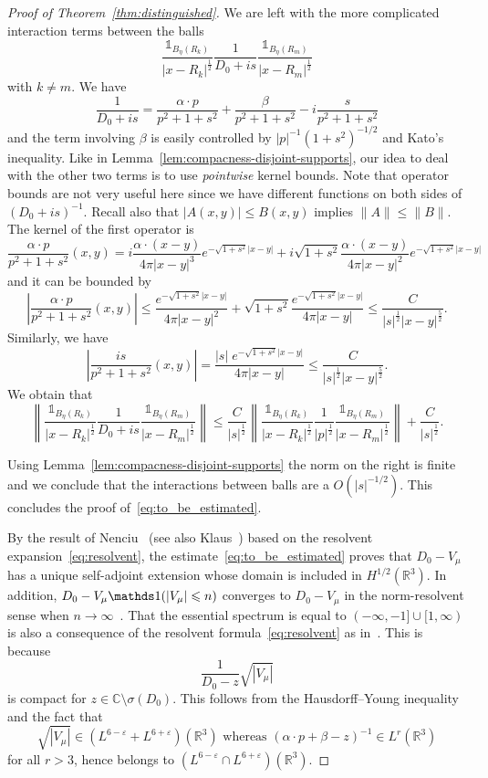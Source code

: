 \documentclass[AHL,Unicode,published]{cedram}
\newcommand{\R}{\mathbb{R}}
\newcommand{\C}{\mathbb{C}}
\newcommand\1{{\ensuremath {\mathds 1} }}
\newcommand{\ii}{\infty}
\newcommand{\norm}[1]{ \left\| #1 \right\|}
\renewcommand{\leq}{\leqslant}
\newcommand{\eps}{\varepsilon}
\begin{document}
\begin{proof}[Proof of Theorem~\ref{thm:distinguished}]
We are left with the more complicated interaction terms between the balls
\begin{equation}\label{eq:interaction_two_balls}
\frac{\1_{B_\eta(R_k)}}{\left|x-R_k\right|^{\frac12}}\frac{1}{D_0+is}\frac{\1_{B_\eta(R_m)}}{\left|x-R_m\right|^{\frac12}}
\end{equation}
with $k\neq m$. We have
\[
\frac{1}{D_0+is}=\frac{\alpha\cdot p}{p^2+1+s^2}+\frac{\beta}{p^2+1+s^2}-i\frac{s}{p^2+1+s^2}
\]
and the term involving $\beta$ is easily controlled by $|p|^{-1}(1+s^2)^{-1/2}$ and Kato's inequality. Like in Lemma~\ref{lem:compacness-disjoint-supports}, our idea to deal with the other two terms is to use \emph{pointwise} kernel bounds. Note that operator bounds are not very useful here since we have different functions on both sides of $(D_0+is)^{-1}$. Recall also that $|A(x,y)|\leq B(x,y)$ implies $\|A\|\leq\|B\|$. The kernel of the first operator is
\[
\frac{\alpha\cdot p}{p^2+1+s^2}(x,y)=i\frac{\alpha\cdot(x-y)}{4\pi|x-y|^3}e^{-\sqrt{1+s^2}|x-y|}+i\sqrt{1+s^2}\frac{\alpha\cdot(x-y)}{4\pi|x-y|^2}e^{-\sqrt{1+s^2}|x-y|}
\]
and it can be bounded by
\[
\left|\frac{\alpha\cdot p}{p^2+1+s^2}(x,y)\right|\leq \frac{e^{-\sqrt{1+s^2}|x-y|}}{4\pi|x-y|^2}+\sqrt{1+s^2}\frac{e^{-\sqrt{1+s^2}|x-y|}}{4\pi|x-y|}\leq \frac{C}{|s|^{\frac12}|x-y|^{\frac52}}.
\]
Similarly, we have
\[
\left|\frac{is}{p^2+1+s^2}(x,y)\right|=\frac{|s|\;e^{-\sqrt{1+s^2}|x-y|}}{4\pi|x-y|}\leq \frac{C}{|s|^{\frac12}|x-y|^{\frac52}}.
\]
We obtain that
\begin{equation}
\norm{\frac{\1_{B_\eta(R_k)}}{\left|x-R_k\right|^{\frac12}}\frac{1}{D_0+is}\frac{\1_{B_\eta(R_m)}}{\left|x-R_m\right|^{\frac12}}}
\leq \frac{C}{|s|^{\frac12}}\norm{\frac{\1_{B_\eta(R_k)}}{\left|x-R_k\right|^{\frac12}}\frac{1}{|p|^{\frac12}}\frac{\1_{B_\eta(R_m)}}{\left|x-R_m\right|^{\frac12}}}+\frac{C}{|s|^{\frac12}}.
\end{equation}

\noindent Using Lemma~\ref{lem:compacness-disjoint-supports} the norm on the right is finite and we conclude that the interactions between balls are a $O(|s|^{-1/2})$. This concludes the proof of~\eqref{eq:to_be_estimated}.

By the result of Nenciu~\cite[Corollary~2.1]{Nenciu-76} (see also Klaus~\cite{Klaus-80b}) based on the resolvent expansion~\eqref{eq:resolvent}, the estimate~\eqref{eq:to_be_estimated} proves that $D_0-V_\mu$ has a unique self-adjoint extension whose domain is included in $H^{1/2}(\R^3)$. In addition, $D_0-V_\mu\1(|V_\mu|\linebreak\leq n)$ converges to $D_0-V_\mu$ in the norm-resolvent sense when $n\to\ii$~\cite{Klaus-80b,KlaWus-79}. That the essential spectrum is equal to $(-\ii,-1]\cup[1,\ii)$ is also a consequence of the resolvent formula~\eqref{eq:resolvent} as in~\cite{KlaWus-79,Nenciu-76}. This is because
\[
\frac{1}{D_0-z}\sqrt{\left|V_\mu\right|}
\]
is compact for $z\in\C\setminus\sigma(D_0)$. This follows from the Hausdorff--Young inequality and the fact that
\[
\sqrt{\left|V_\mu\right|}\in \left(L^{6-\eps}+L^{6+\eps}\right)\left(\R^3\right)\text{ whereas }\left(\alpha\cdot p+\beta -z\right)^{-1}\in L^r\left(\R^3\right)
\]
for all $r>3$, hence belongs to $(L^{6-\eps}\cap L^{6+\eps})(\R^3)$.


\end{proof}
\end{document}
